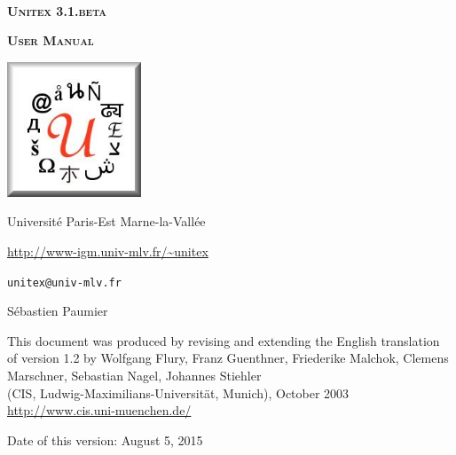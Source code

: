 
\begin{titlepage}
\begin{center}

~

\vspace{3cm}
\Huge
\textsc{\textbf{Unitex 3.1.beta}}

\vspace{1cm}

\huge
\textsc{\textbf{User Manual}}

\vspace{2cm}

  \begin{center}
    \includegraphics[width=4cm]{resources/img/logo-Unitex.png}
  \end{center}
\normalsize

\vspace{2cm}

\LARGE

Université Paris-Est Marne-la-Vallée
\bigskip
\normalsize

\url{http://www-igm.univ-mlv.fr/~unitex}

\verb$unitex@univ-mlv.fr$

\vspace{0.5cm}

Sébastien Paumier
\bigskip

This document was produced by revising and extending the English translation\\
of version 1.2 by Wolfgang Flury, Franz Guenthner, Friederike Malchok, Clemens Marschner, 
 Sebastian Nagel, Johannes Stiehler\\
 (CIS, Ludwig-Maximilians-Universit\"at, Munich), October 2003\\
\url{http://www.cis.uni-muenchen.de/}

\bigskip
Date of this version: August 5, 2015
\end{center}

\end{titlepage}
